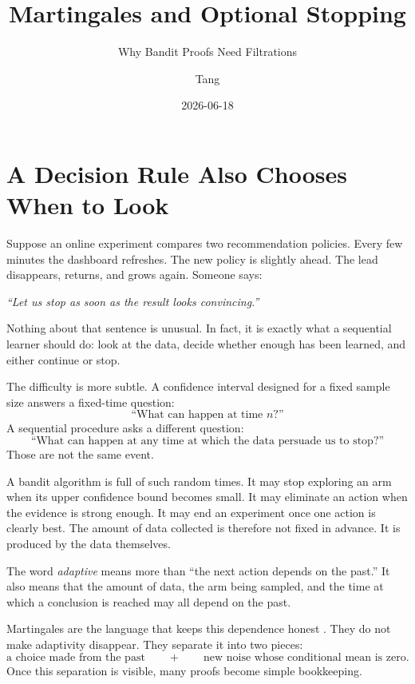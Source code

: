 \documentclass[en,nofont,11pt]{elegantbook}
\title{Martingales and Optional Stopping}
\subtitle{Why Bandit Proofs Need Filtrations}
\author{Tang}
\institute{Tang's Machine Learning Blog}
\date{2026-06-18}
\begin{document}
\maketitle
\frontmatter
\tableofcontents
\mainmatter

\chapter{A Decision Rule Also Chooses When to Look}

Suppose an online experiment compares two recommendation policies. Every few minutes the dashboard refreshes. The new policy is slightly ahead. The lead disappears, returns, and grows again. Someone says:

\begin{center}
\emph{``Let us stop as soon as the result looks convincing.''}
\end{center}

Nothing about that sentence is unusual. In fact, it is exactly what a sequential learner should do: look at the data, decide whether enough has been learned, and either continue or stop.

The difficulty is more subtle. A confidence interval designed for a fixed sample size answers a fixed-time question:
\[
\text{``What can happen at time }n\text{?''}
\]
A sequential procedure asks a different question:
\[
\text{``What can happen at any time at which the data persuade us to stop?''}
\]
Those are not the same event.

A bandit algorithm is full of such random times. It may stop exploring an arm when its upper confidence bound becomes small. It may eliminate an action when the evidence is strong enough. It may end an experiment once one action is clearly best. The amount of data collected is therefore not fixed in advance. It is produced by the data themselves.

\begin{keyidea}
The word \emph{adaptive} means more than ``the next action depends on the past.'' It also means that the amount of data, the arm being sampled, and the time at which a conclusion is reached may all depend on the past.
\end{keyidea}

Martingales are the language that keeps this dependence honest \cite{williams1991probability,lattimore2020bandit}. They do not make adaptivity disappear. They separate it into two pieces:
\[
\boxed{\text{a choice made from the past}}
\qquad+
\qquad
\boxed{\text{new noise whose conditional mean is zero}.}
\]
Once this separation is visible, many proofs become simple bookkeeping.
\end{document}
